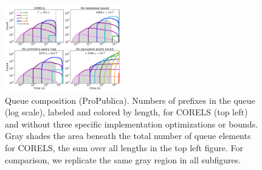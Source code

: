 \begin{table}[t!]
\centering
{}
\vspace{4mm}
\caption{Per-component performance improvement (ProPublica).
%
Columns report total execution time,
time to optimum, number of queue insertions,
maximum queue size, and maximum evaluated prefix length.
%
The first row shows CORELS; subsequent rows show variants
that each remove one implementation optimization or bound.
%
We terminated each experiment in the last row once the size of the
trie reached ${10^9}$ nodes (each execution consumed $\sim$350GB RAM).
%
In all but the final row and column, we report means
(and standard deviations) over 10 cross-validation folds;
in the final row, we report the minimum values across folds.
}
\label{tab:ablation}
\end{table}

\begin{figure}[t!]
\begin{center}
\includegraphics[trim={10mm 15mm 10mm 32mm},
width=0.45\textwidth]{figs/kdd_compas_ablation_small-queue.pdf}
\end{center}
\caption{Queue composition (ProPublica).
%
Numbers of prefixes in the queue (log scale), labeled and colored by length,
for CORELS (top left) and without three specific implementation optimizations or bounds.
%
Gray shades the area beneath the total number of
queue elements for CORELS,
\ie the sum over all lengths in the top left figure.
%
For comparison, we replicate the same gray region in all subfigures.
}
\label{fig:queue}
\end{figure}


